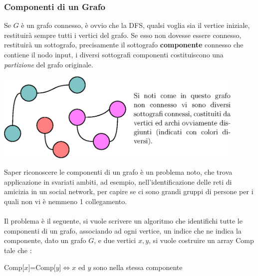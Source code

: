 \documentclass[12pt, letterpaper]{article}
\newcommand{\acc}{\\\hphantom{}\\}
\begin{document}
\subsubsection{Componenti di un Grafo}
Se \(G\) è un grafo connesso, è ovvio che la DFS, qualsi voglia sia il vertice iniziale, restituirà sempre tutti
i vertici del grafo. Se esso non dovesse essere connesso, restituirà un sottografo, precisamente il sottografo
\textbf{componente} connesso che contiene il nodo input, i diversi sottografi componenti costituiscono una
\textit{partizione} del grafo originale.\begin{center}
    \includegraphics[width=0.9\textwidth ]{images/comp.eps}
\end{center}
Saper riconoscere le componenti di un grafo è un problema noto, che trova applicazione in svariati ambiti, ad esempio,
nell'identificazione delle reti di amicizia in un social network, per capire se ci sono grandi gruppi di persone
per i quali non vi è nemmeno 1 collegamento.\acc
Il problema è il seguente, si vuole scrivere un algoritmo che identifichi tutte le componenti di un grafo,
associando ad ogni vertice, un indice che ne indica la componente, dato un grafo \(G\), e due vertici
\(x,y\), si vuole costruire
un array Comp  tale che : \begin{center}
    Comp[\(x\)]=Comp[\(y\)]\(\iff\)\(x\) ed \(y\) sono nella stessa componente
\end{center}
\end{document}

